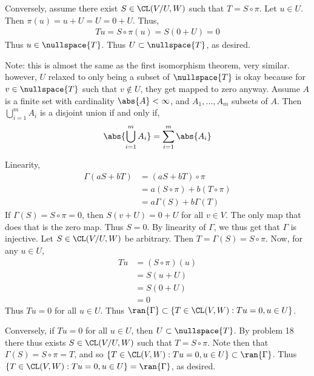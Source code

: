 \documentclass{book}
\begin{document}
\begin{enumerate}[label=\arabic*)]
      Conversely, assume there exist $S \in \CL(V/U, W)$ such that $T = S \circ \pi$. Let $u \in U$. Then $\pi(u) = u + U = U = 0 + U$. Thus,
      \begin{align*}
        Tu = S \circ \pi(u) = S(0 + U) = 0
      \end{align*}
      Thus $u \in \nullspace{T}$. Thus $U \subset \nullspace{T}$, as desired.


      Note: this is almost the same as the first isomorphism theorem, very similar. however, $U$ relaxed to only being a subset of $\nullspace{T}$ is okay because for $v \in
      \nullspace{T}$ such that $v \not\in U$, they get mapped to zero anyway.
    \ii
      Assume $A$ is a finite set with cardinality $\abs{A} < \infty$, and $A_1, \dots, A_m$ subsets of $A$. Then $\bigcup_{i = 1}^{m}A_i$ is a disjoint union if and only if,
      \begin{align*}
        \abs{\bigcup_{i = 1}^{m}A_i} = \sum_{i = 1}^{m}\abs{A_i}
      \end{align*}
    \ii
      \begin{enumerate}[label=\alph*)]
        \ii Linearity,
          \begin{align*}
            \Gamma(aS + bT) & = (aS + bT) \circ \pi \\
            & = a(S \circ \pi) + b(T \circ \pi) \\
            & = a\Gamma(S) + b\Gamma(T)
          \end{align*}
        \ii 
          If $\Gamma(S) = S \circ \pi = 0$, then $S(v + U) = 0 + U$ for all $v \in V$. The only map that does that is the zero map. Thus $S = 0$. By linearity of $\Gamma$, we thus get that
          $\Gamma$ is injective.
        \ii
          Let $S \in \CL(V/U, W)$ be arbitrary. Then $T = \Gamma(S) = S \circ \pi$. Now, for any $u \in U$, 
          \begin{align*}
            Tu & = (S \circ \pi)(u) \\
            & = S(u + U) \\
            & = S(0 + U) \\
            & = 0
          \end{align*}
          Thus $Tu = 0$ for all $u \in U$. Thus $\ran{\Gamma} \subset \{T \in \CL(V, W): Tu = 0, u \in U\}$. 

          Conversely, if $Tu = 0$ for all $u \in U$, then $U \subset \nullspace{T}$. By problem 18 there thus exists $S \in \CL(V/U, W)$ such that $T = S \circ \pi$. Note then that
          $\Gamma(S) = S \circ \pi = T$, and so $\{T \in \CL(V, W): Tu = 0, u \in U\} \subset \ran{\Gamma}$. Thus $\{T \in \CL(V, W): Tu = 0, u \in U\} = \ran{\Gamma}$, as desired.
      \end{enumerate}
  \end{enumerate}
\end{document}
